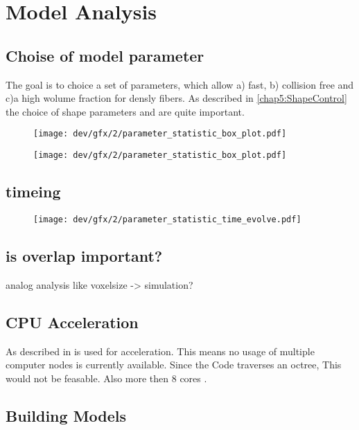\setcounter{chapter}{6}
\chapter{Model Analysis}
\label{cha:model_analysis}
% 
\section{Choise of model parameter}
% 
The goal is to choice a set of parameters, which allow a) fast, b) collision free and c)a high wolume fraction for densly fibers. 
% 
As described in \cref{chap5:ShapeControl} the choice of shape parameters \segLength and \segRadius are quite important.
% 
\begin{figure}[!t]
\centering
\texttt{[image: dev/gfx/2/parameter\_statistic\_box\_plot.pdf]}
\caption{}
\end{figure}
% 
\begin{figure}[!t]
\centering
\texttt{[image: dev/gfx/2/parameter\_statistic\_box\_plot.pdf]}
\caption{}
\end{figure}
% 
\section{timeing}
% 
\begin{figure}[!t]
\centering
\texttt{[image: dev/gfx/2/parameter\_statistic\_time\_evolve.pdf]}
\caption{}
\end{figure}
% 
\section{is overlap important?}
% 
analog analysis like voxelsize -> simulation?
% 
\section{CPU Acceleration}
% 
As described in \dummy \openmp is used for acceleration.
This means no usage of multiple computer nodes is currently available.
Since the Code traverses an octree, This would not be feasable.
Also more then 8 cores \dummy.
% 
\begin{figure}[!t]
\centering
\def\tikzwidth{\textwidth}
\caption{}
\end{figure}

% 
\section{Building Models}
% 
\tikzexternaldisable
% 
\begin{figure}[!t]
\centering
\caption{}
\end{figure}
% 
\tikzexternalenable
